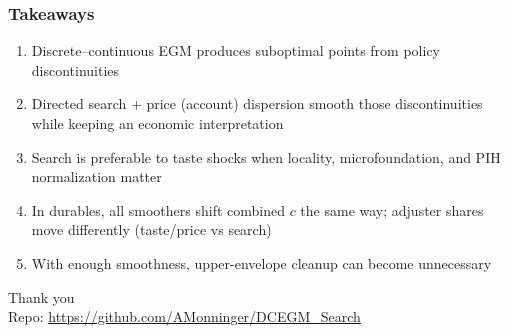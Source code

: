 \documentclass[aspectratio=169]{beamer}
\begin{document}
\begin{frame}[label = Conclusion]
	\frametitle{Takeaways}
	\begin{enumerate}\setlength\itemsep{0.85em}
		\item Discrete--continuous EGM produces suboptimal points from policy discontinuities
		\item Directed search + price (account) dispersion smooth those discontinuities while keeping an economic interpretation
		\item Search is preferable to taste shocks when locality, microfoundation, and PIH normalization matter
		\item In durables, all smoothers shift combined $c$ the same way; adjuster shares move differently (taste/price vs search)
		\item With enough smoothness, upper-envelope cleanup can become unnecessary
	\end{enumerate}
\end{frame}

\begin{frame}[plain]
	\centering
	\vspace{2.5em}
	{\LARGE Thank you}\\[1.5em]
	{\large Repo: \url{https://github.com/AMonninger/DCEGM_Search}}
\end{frame}
\end{document}
